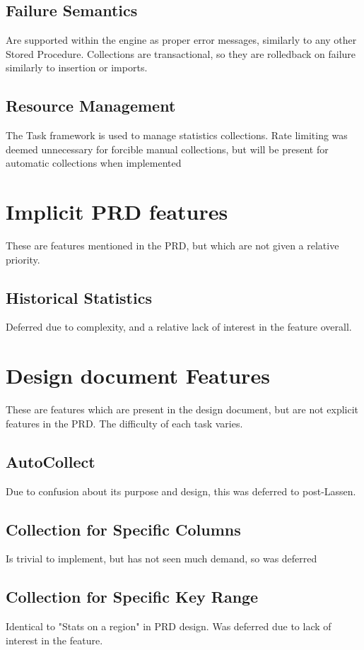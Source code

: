 \subsection{Failure Semantics} Are supported within the engine as proper error messages, similarly to any other Stored Procedure. Collections are transactional, so they are rolledback on failure similarly to insertion or imports.
\subsection{Resource Management} The Task framework is used to manage statistics collections. Rate limiting was deemed unnecessary for forcible manual collections, but will be present for automatic collections when implemented

\section{Implicit PRD features}
These are features mentioned in the PRD, but which are not given a relative priority.
\subsection{Historical Statistics} Deferred due to complexity, and a relative lack of interest in the feature overall.

\section{Design document Features}
These are features which are present in the design document, but are not explicit features in the PRD. The difficulty of each task varies.

\subsection{AutoCollect} Due to confusion about its purpose and design, this was deferred to post-Lassen.
\subsection{Collection for Specific Columns} Is trivial to implement, but has not seen much demand, so was deferred
\subsection{Collection for Specific Key Range} Identical to "Stats on a region" in PRD design. Was deferred due to lack of interest in the feature.
